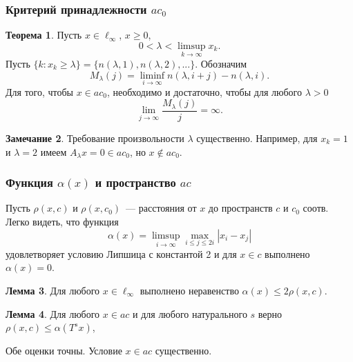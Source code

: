 \documentclass[10pt,pdf,hyperref={unicode},aspectratio=169]{beamer}
\theoremstyle{definition}
\newtheorem{llemma}{Лемма}
\newtheorem{ttheorem}[llemma]{Теорема}
\newtheorem{remark}[llemma]{Замечание}
\begin{document}
\begin{frame}
	\frametitle{Критерий принадлежности $ac_0$~\cite{our-mz2019ac0}}



	\begin{ttheorem}
		Пусть $x\in\ell_\infty$, $x \geq 0$,
		\begin{equation*}
			0<\lambda < \limsup_{k\to\infty} x_k
			.
		\end{equation*}
		Пусть $\{k: x_k \geq \lambda \} = \{n(\lambda,1),n(\lambda,2),...\}$.
		Обозначим
		\begin{equation*}
			M_{\lambda}(j) = \liminf_{i\to\infty} n(\lambda,i+j) - n(\lambda,i)
			.
		\end{equation*}
		Для того, чтобы $x\in ac_0$, необходимо и достаточно, чтобы
		для любого $\lambda>0$
		\begin{equation*}
			\lim_{j \to \infty} \frac{M_{\lambda}(j)}{j} = \infty
			.
		\end{equation*}
	\end{ttheorem}


	\begin{remark}
		Требование произвольности $\lambda$ существенно.
		Например, для $x_k = 1$ и $\lambda = 2$ имеем $A_\lambda x = 0 \in ac_0$,
		но $x\notin ac_0$.
	\end{remark}


\end{frame}


\begin{frame}
	\frametitle{Функция $\alpha(x)$ и пространство $ac$~\cite{our-mz2019ac0}}
	Пусть $\rho(x,c)$ и $\rho(x,c_0)$~--- расстояния от $x$ до пространств $c$
	и $c_0$ соотв.
	Легко видеть, что функция
	\begin{equation*}
		\alpha(x) = \limsup_{i\to\infty} \max_{i \leq j \leq 2i} |x_i-x_j|
	\end{equation*}
	удовлетворяет условию Липшица с константой 2
	и для $x\in c$ выполнено
	$\alpha(x)=0$.

	\begin{llemma}
	\label{thm:alpha_x_leq_2_rho_x_c}
		Для любого $x\in\ell_\infty$
		выполнено неравенство
		$
			\alpha(x) \leq 2\rho(x, c)
		$.
	\end{llemma}


	\begin{llemma}
	\label{thm:rho_x_c_leq_alpha_t_s_x}
		Для любого $x\in ac$ и для любого натурального $s$ верно
		$
			\rho(x,c)\leq \alpha(T^s x)
		$,
	\end{llemma}

	Обе оценки точны.
	Условие $x\in ac$ существенно.

\end{frame}
\end{document}
